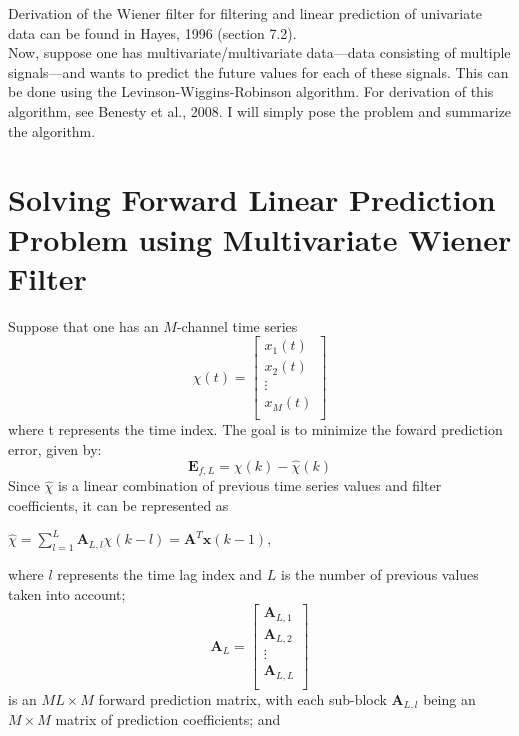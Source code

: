 \documentclass{article}
\begin{document}
Derivation of the Wiener filter for filtering and linear prediction of univariate data can be found in Hayes, 1996 (section 7.2).\\

Now, suppose one has multivariate/multivariate data---data consisting of multiple signals---and wants to predict the future values for each of these signals. This can be done using the Levinson-Wiggins-Robinson algorithm. For derivation of this algorithm, see Benesty et al., 2008. I will simply pose the problem and summarize the algorithm.

\section{Solving Forward Linear Prediction Problem using Multivariate Wiener Filter}
Suppose that one has an $M$-channel time series\\
\[
  \chi(t) = \begin{bmatrix}
    x_{1}(t) \\
    x_{2}(t) \\
    \vdots \\
    x_{M}(t)\\
  \end{bmatrix}
\]
where t represents the time index. The goal is to minimize the foward prediction error, given by:\\
\begin{equation}
  \textbf{E}_{f,L} = \chi(k) - \hat{\chi}(k)
\end{equation}
Since $\hat{\chi}$ is a linear combination of previous time series values and filter coefficients, it can be represented as\\
\begin{center}
  $\hat{\chi} = \sum^{L}_{l=1}\textbf{A}_{L,l}\chi(k-l) = \textbf{A}^{T}\textbf{x}(k-1)$,
\end{center}
where $l$ represents the time lag index and $L$ is the number of previous values taken into account;\\
\[
  \textbf{A}_{L} = \begin{bmatrix}
    \textbf{A}_{L,1} \\
    \textbf{A}_{L,2} \\
    \vdots \\
    \textbf{A}_{L,L}\\
  \end{bmatrix}
\]
is an $ML \times M$ forward prediction matrix, with each sub-block $\textbf{A}_{L,l}$ being an $M \times M$ matrix of prediction coefficients; and\\
\end{document}
